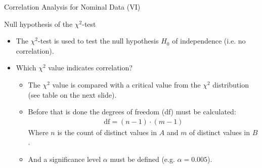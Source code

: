 \begin{frame}{Correlation Analysis for Nominal Data (VI)}
	\begin{block}{Null hypothesis of the $\chi^2$-test}
		\begin{itemize}
			\item The $\chi^2$-test is used to test the null hypothesis $H_0$ of independence (i.e. no correlation).
		\end{itemize}
	\end{block}

	\begin{itemize}
		\item Which $\chi^2$ value indicates correlation?
		      \begin{itemize}
			      \item The $\chi^2$ value is compared with a critical value from the
			            $\chi^2$ distribution (see table on the next slide).
			      \item Before that is done the degrees of freedom (df) must be
			            calculated:
			            \begin{align*}
				            \text{df} = (n-1) \cdot (m-1)
			            \end{align*}
			            Where $n$ is the count of distinct values in $A$ and $m$ of distinct values in $B$.
			      \item And a significance level $\alpha$ must be defined (e.g. $\alpha = 0.005$).
		      \end{itemize}
	\end{itemize}
\end{frame}

